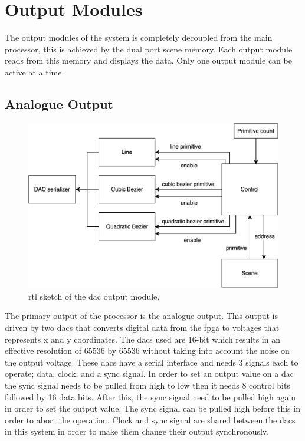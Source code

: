 \chapter{Output Modules}
\label{chap:Output}

The output modules of the system is completely decoupled from the main processor, this is achieved by the dual port scene memory.
Each output module reads from this memory and displays the data.
Only one output module can be active at a time.

\section{Analogue Output}

\begin{figure}[h!]
    \includegraphics[width=\linewidth]{images/dac-output.png}
    \caption{\gls{rtl} sketch of the \vthreek \gls{dac} output module.}
    \label{fig:dac-output}
\end{figure}

The primary output of the processor is the analogue output.
This output is driven by two \gls{dac}s that converts digital data from the \gls{fpga} to voltages that represents x and y coordinates.
The \gls{dac}s used are 16-bit which results in an effective resolution of 65536 by 65536 without taking into account the noise on the output voltage.
These \gls{dac}s have a serial interface and needs 3 signals each to operate; data, clock, and a sync signal.
In order to set an output value on a \gls{dac} the sync signal needs to be pulled from high to low then it needs 8 control bits followed by 16 data bits.
After this, the sync signal need to be pulled high again in order to set the output value.
The sync signal can be pulled high before this in order to abort the operation.
Clock and sync signal are shared between the \gls{dac}s in this system in order to make them change their output synchronously.

